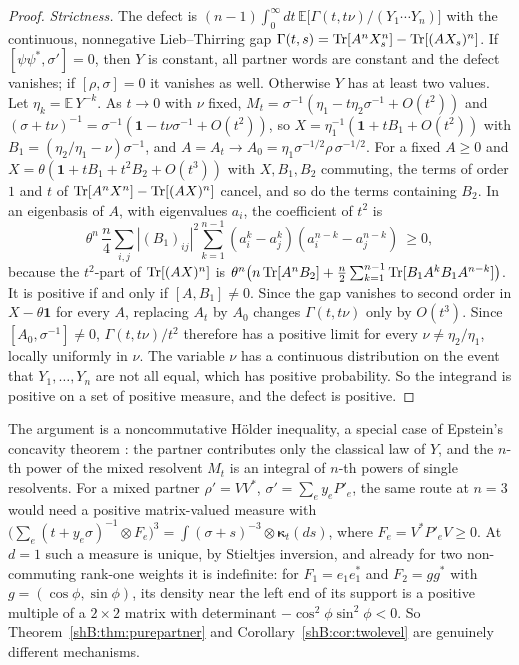 \begin{proof}
\emph{Strictness.} The defect is $(n-1)\int_0^\infty dt\,\mathbb E\big[\Gamma(t,t\nu)/(Y_1\cdots Y_n)\big]$ with the continuous, nonnegative Lieb--Thirring gap $\Gamma(t,s)=\operatorname{Tr}[A^nX_s^n]-\operatorname{Tr}[(AX_s)^n]$. If $[\psi\psi^*,\sigma']=0$, then $Y$ is constant, all partner words are constant and the defect vanishes; if $[\rho,\sigma]=0$ it vanishes as well. Otherwise $Y$ has at least two values. Let $\eta_k=\mathbb E\,Y^{-k}$. As $t\to0$ with $\nu$ fixed, $M_t=\sigma^{-1}(\eta_1-t\eta_2\sigma^{-1}+O(t^2))$ and $(\sigma+t\nu)^{-1}=\sigma^{-1}(\mathbf 1-t\nu\sigma^{-1}+O(t^2))$, so $X=\eta_1^{-1}(\mathbf 1+tB_1+O(t^2))$ with $B_1=(\eta_2/\eta_1-\nu)\sigma^{-1}$, and $A=A_t\to A_0=\eta_1\sigma^{-1/2}\rho\,\sigma^{-1/2}$. For a fixed $A\ge0$ and $X=\theta(\mathbf 1+tB_1+t^2B_2+O(t^3))$ with $X,B_1,B_2$ commuting, the terms of order $1$ and $t$ of $\operatorname{Tr}[A^nX^n]-\operatorname{Tr}[(AX)^n]$ cancel, and so do the terms containing $B_2$. In an eigenbasis of $A$, with eigenvalues $a_i$, the coefficient of $t^2$ is
\[
\theta^n\,\frac n4\sum_{i,j}|(B_1)_{ij}|^2\sum_{k=1}^{n-1}(a_i^k-a_j^k)(a_i^{n-k}-a_j^{n-k})\ \ge0,
\]
because the $t^2$-part of $\operatorname{Tr}[(AX)^n]$ is $\theta^n\big(n\operatorname{Tr}[A^nB_2]+\frac n2\sum_{k=1}^{n-1}\operatorname{Tr}[B_1A^kB_1A^{n-k}]\big)$. It is positive if and only if $[A,B_1]\ne0$. Since the gap vanishes to second order in $X-\theta\mathbf 1$ for every $A$, replacing $A_t$ by $A_0$ changes $\Gamma(t,t\nu)$ only by $O(t^3)$. Since $[A_0,\sigma^{-1}]\ne0$, $\Gamma(t,t\nu)/t^2$ therefore has a positive limit for every $\nu\ne\eta_2/\eta_1$, locally uniformly in $\nu$. The variable $\nu$ has a continuous distribution on the event that $Y_1,\dots,Y_n$ are not all equal, which has positive probability. So the integrand is positive on a set of positive measure, and the defect is positive.
\end{proof}

The argument is a noncommutative H\"older inequality, a special case of Epstein's concavity theorem \cite{Epstein1973}: the partner contributes only the classical law of $Y$, and the $n$-th power of the mixed resolvent $M_t$ is an integral of $n$-th powers of single resolvents. For a mixed partner $\rho'=VV^*$, $\sigma'=\sum_ey_eP'_e$, the same route at $n=3$ would need a positive matrix-valued measure with $\big(\sum_e(t+y_e\sigma)^{-1}\otimes F_e\big)^3=\int(\sigma+s)^{-3}\otimes\boldsymbol\kappa_t(ds)$, where $F_e=V^*P'_eV\ge0$. At $d=1$ such a measure is unique, by Stieltjes inversion, and already for two non-commuting rank-one weights it is indefinite: for $F_1=e_1e_1^*$ and $F_2=gg^*$ with $g=(\cos\phi,\sin\phi)$, its density near the left end of its support is a positive multiple of a $2\times2$ matrix with determinant $-\cos^2\phi\sin^2\phi<0$. So Theorem~\ref{shB:thm:purepartner} and Corollary~\ref{shB:cor:twolevel} are genuinely different mechanisms.

